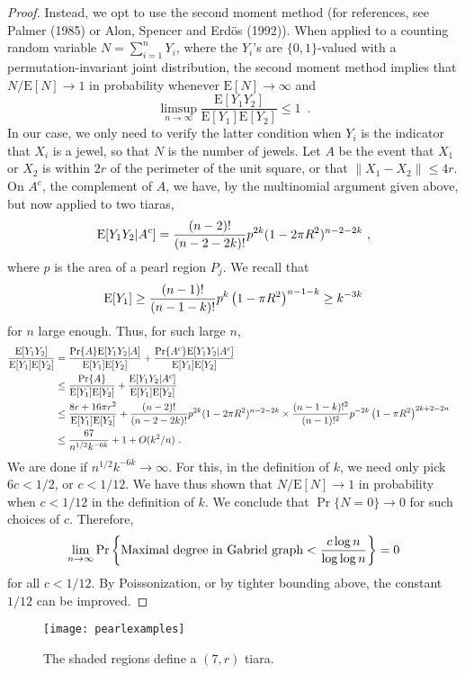 \documentclass[lotsofwhite,charterfonts]{patmorin}
\newcommand{\PROB}{\Pr}
\newcommand{\EXP}{\mathrm{E}}
\begin{document}
\begin{proof}
Instead, we opt to use the second moment
method (for references, see Palmer (1985) or
Alon, Spencer and Erd\"os (1992)). When
applied to a counting random variable $N = \sum_{i=1}^n Y_i$,
where the $Y_i$'s are $\{ 0,1 \}$-valued with
a permutation-invariant joint distribution,
the second moment method implies that
$N/\EXP[N] \to 1$ in probability whenever
$\EXP[N]\to \infty$ and
\[
\limsup_{n\to\infty} \frac{\EXP[Y_1 Y_2]}{\EXP[Y_1]\EXP[Y_2]} \le 1 \enspace .
\]
In our case, we only need to verify the latter
condition when $Y_i$ is the indicator that
$X_i$ is a jewel, so that $N$ is the number of jewels.
Let $A$ be the event that $X_1$ or $X_2$ is within
$2r$ of the perimeter of the unit square, or that
$\| X_1 - X_2 \| \le 4r$.
On $A^c$, the complement of $A$, we have, by
the multinomial argument given above, but now
applied to two tiaras,
\[
\EXP[Y_1 Y_2 | A^c]
= { (n-2)! \over (n-2-2k)! } p^{2k} (1-2\pi R^2)^{n-2-2k}~,
\]
where $p$ is the area of a pearl region $P_j$.
We recall that
\[
\EXP[Y_1]\ge
{(n-1)! \over (n-1-k)!} p^k \left( 1 - \pi R^2 \right)^{n-1-k}
\ge k^{-3k}
\]
for $n$ large enough.
Thus, for such large $n$,
\[
\begin{aligned}
{\EXP[Y_1 Y_2] \over \EXP[Y_1]\EXP[Y_2]} 
&=
{\PROB\{A\}\EXP[Y_1 Y_2 |A ] \over \EXP[Y_1]\EXP[Y_2]}
+ {\PROB\{A^c\}\EXP [ Y_1 Y_2 | {A^c} ] \over \EXP[Y_1]\EXP[Y_2]} \cr
&\le
{\PROB \{ A \} \over \EXP[Y_1]\EXP[Y_2]}
+ {\EXP [ Y_1 Y_2 | A^c ] \over \EXP[Y_1]\EXP[Y_2]} \cr
&\le
{8r + 16 \pi r^2 \over \EXP[Y_1]\EXP[Y_2]}
+ { (n-2)! \over (n-2-2k)! } p^{2k} (1-2\pi R^2)^{n-2-2k}\times
{(n-1-k)!^2 \over (n-1)!^2} p^{-2k} \left( 1 - \pi R^2 \right)^{2k+2-2n} \cr
&\le
{67 \over n^{1/2} k^{-6k}} + 1 + O(k^2/n) ~. \cr
\end{aligned}
\]
We are done if $n^{1/2} k^{-6k} \to \infty$. For this,
in the definition of $k$, we need only pick
$6c < 1/2$, or $c < 1/12$.
We have thus shown that $N/\EXP[N]\to 1$ in probability
when $c < 1/12$ in the definition of $k$.
We conclude that
$\PROB \{ N = 0 \}  \to 0$ for such choices of $c$.
Therefore,
\[
\lim_{n\to\infty}
\PROB \left\{ \hbox{\rm Maximal degree in Gabriel graph}
	   < {c \log n \over \log \log n } \right\}
	   = 0
\]
for all $c < 1/12$.
By Poissonization, or by
tighter bounding above, the constant $1/12$ can be improved.
\end{proof}


\begin{figure}
\begin{center}{\texttt{[image: pearlexamples]}}\end{center}
\caption{The shaded regions define a $(7,r)$ tiara.}
\end{figure}
\end{document}
